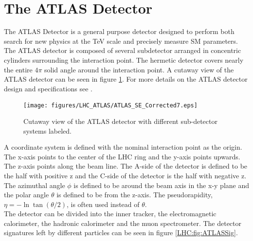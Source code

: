 \section{The ATLAS Detector}
\label{LHC:detector}

\indent The ATLAS Detector is a general purpose detector designed to perform both search for new physics at the TeV scale and precisely measure SM parameters.  The ATLAS detector is composed of several subdetector arranged in concentric cylinders surrounding the interaction point.  The hermetic detector covers nearly the entire $4\pi$ solid angle around the interaction point. A cutaway view of the ATLAS detector can be seen in figure \ref{LHC:fig:ATLASDet}.  For more details on the ATLAS detector design and specifications see \cite{ATLAS_JINST}.  \\


\begin{figure}[h!]
\centering
\texttt{[image: figures/LHC\_ATLAS/ATLAS\_SE\_Corrected7.eps]}
\caption{ Cutaway view of the ATLAS detector with different sub-detector systems labeled. \label{LHC:fig:ATLASDet}}
\end{figure}

\indent A coordinate system is defined with the nominal interaction point as the origin.  The x-axis points to the center of the LHC ring and the y-axis points upwards.  The z-axis points along the beam line.  The A-side of the detector is defined to be the half with positive z and the C-side of the detector is the half with negative z.  The azimuthal angle $\phi$ is defined to be around the beam axis in the x-y plane and the polar angle $\theta$ is defined to be from the z-axis.  The pseudorapidity, $\eta = -\ln  \tan (\theta/2) $, is often used instead of $\theta$.  \\%

\indent The detector can be divided into the inner tracker, the electromagnetic calorimeter, the hadronic calorimeter and the muon spectrometer.  The detector signatures left by different particles can be seen in figure \ref{LHC:fig:ATLASSig}. \\


